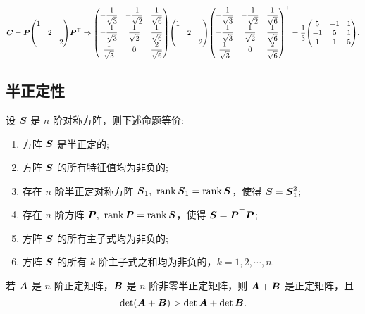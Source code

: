 \begin{solution}
\begin{enumerate}[label=(\arabic{*})]
        $\vb*{C}=\vb*{P}\mqty(1\\&2\\&&2)\vb*{P}^\top\Rightarrow\mqty(-\dfrac{1}{\sqrt{3}}&-\dfrac{1}{\sqrt{2}}&\dfrac{1}{\sqrt{6}}\\[6pt]-\dfrac{1}{\sqrt{3}}&\dfrac{1}{\sqrt{2}}&\dfrac{1}{\sqrt{6}}\\[6pt]\dfrac{1}{\sqrt{3}}&0&\dfrac{2}{\sqrt{6}})\mqty(1\\&2\\&&2)\mqty(-\dfrac{1}{\sqrt{3}}&-\dfrac{1}{\sqrt{2}}&\dfrac{1}{\sqrt{6}}\\[6pt]-\dfrac{1}{\sqrt{3}}&\dfrac{1}{\sqrt{2}}&\dfrac{1}{\sqrt{6}}\\[6pt]\dfrac{1}{\sqrt{3}}&0&\dfrac{2}{\sqrt{6}})^\top=\dfrac{1}{3}\mqty(5&-1&1\\-1&5&1\\1&1&5).$
    \end{enumerate}
\end{solution}

\subsection{半正定性}

\begin{theorem}[对称方阵的等价命题]
    设 $\vb*{S}$ 是 $n$ 阶对称方阵，则下述命题等价:
    \begin{enumerate}[label=(\arabic{*})]
        \item 方阵 $\vb*{S}$ 是半正定的;
        \item 方阵 $\vb*{S}$ 的所有特征值均为非负的;
        \item 存在 $n$ 阶半正定对称方阵 $\vb*{S}_1,~\rank\vb*{S}_1=\rank\vb*{S}$，使得 $\vb*{S}=\vb*{S}_1^2$;
        \item 存在 $n$ 阶方阵 $\vb*{P},~\rank\vb*{P}=\rank\vb*{S}$，使得 $\vb*{S}=\vb*{P}^\top\vb*{P}$;
        \item 方阵 $\vb*{S}$ 的所有主子式均为非负的;
        \item 方阵 $\vb*{S}$ 的所有 $k$ 阶主子式之和均为非负的，$k=1,2,\cdots,n.$
    \end{enumerate}
\end{theorem}

\begin{theorem}
    若 $\vb*{A}$  是 $n$ 阶正定矩阵，$\vb*{B}$ 是 $n$ 阶非零半正定矩阵，则 $\vb*{A}+\vb*{B}$ 是正定矩阵，且 $$\det(\vb*{A}+\vb*{B})>\det\vb*{A}+\det\vb*{B}.$$
\end{theorem}

